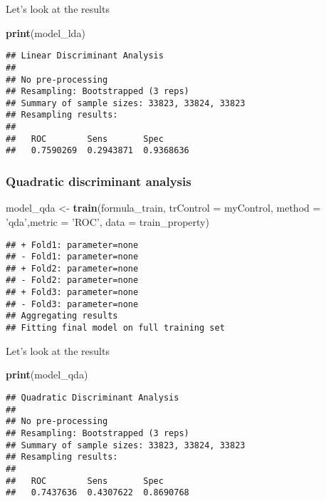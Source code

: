 \documentclass[]{article}
\newenvironment{Shaded}{\begin{snugshade}}{\end{snugshade}}
\newcommand{\KeywordTok}[1]{\textcolor[rgb]{0.13,0.29,0.53}{\textbf{#1}}}
\newcommand{\DataTypeTok}[1]{\textcolor[rgb]{0.13,0.29,0.53}{#1}}
\newcommand{\StringTok}[1]{\textcolor[rgb]{0.31,0.60,0.02}{#1}}
\newcommand{\NormalTok}[1]{#1}
\begin{document}
Let's look at the results

\begin{Shaded}
\begin{Highlighting}[]
\KeywordTok{print}\NormalTok{(model_lda)}
\end{Highlighting}
\end{Shaded}

\begin{verbatim}
## Linear Discriminant Analysis 
## 
## No pre-processing
## Resampling: Bootstrapped (3 reps) 
## Summary of sample sizes: 33823, 33824, 33823 
## Resampling results:
## 
##   ROC        Sens       Spec     
##   0.7590269  0.2943871  0.9368636
\end{verbatim}

\subsubsection{Quadratic discriminant
analysis}\label{quadratic-discriminant-analysis}

\begin{Shaded}
\begin{Highlighting}[]
\NormalTok{model_qda <-}\StringTok{ }\KeywordTok{train}\NormalTok{(formula_train, }\DataTypeTok{trControl =}\NormalTok{ myControl, }
                      \DataTypeTok{method =} \StringTok{'qda'}\NormalTok{,}\DataTypeTok{metric =} \StringTok{'ROC'}\NormalTok{, }\DataTypeTok{data =}\NormalTok{ train_property)}
\end{Highlighting}
\end{Shaded}

\begin{verbatim}
## + Fold1: parameter=none 
## - Fold1: parameter=none 
## + Fold2: parameter=none 
## - Fold2: parameter=none 
## + Fold3: parameter=none 
## - Fold3: parameter=none 
## Aggregating results
## Fitting final model on full training set
\end{verbatim}

Let's look at the results

\begin{Shaded}
\begin{Highlighting}[]
\KeywordTok{print}\NormalTok{(model_qda)}
\end{Highlighting}
\end{Shaded}

\begin{verbatim}
## Quadratic Discriminant Analysis 
## 
## No pre-processing
## Resampling: Bootstrapped (3 reps) 
## Summary of sample sizes: 33823, 33824, 33823 
## Resampling results:
## 
##   ROC        Sens       Spec     
##   0.7437636  0.4307622  0.8690768
\end{verbatim}
\end{document}
